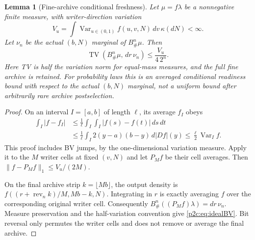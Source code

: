 \documentclass[11pt]{article}
\numberwithin{equation}{section}
\newtheorem{lemma}[theorem]{Lemma}
\theoremstyle{definition}
\theoremstyle{remark}
\begin{document}
\begin{lemma}[Fine-archive conditional freshness]
\label{p2c:lem:BV}
Let $\mu=f\lambda$ be a nonnegative finite measure,
with writer-direction variation
\[
 V_u=\int\operatorname{Var}_{u\in(0,1)}
                         f(u,v,N)\,dv\,\kappa(dN)<\infty.
\]
Let $\nu_n$ be the actual $(b,N)$ marginal of
$B^n_\#\mu$. Then
\begin{equation}\label{p2c:eq:idealBV}
 \operatorname{TV}(B^n_\#\mu,\,dr\,\nu_n)
                   \leq \frac{V_u}{4\,2^n}.
\end{equation}
Here TV is half the variation norm for equal-mass
measures, and the full fine archive is retained. For probability laws
this is an averaged conditional readiness bound with respect to the
actual $(b,N)$ marginal, not a uniform bound after arbitrarily rare
archive postselection.
\end{lemma}

\begin{proof}
On an interval $I=[a,b]$ of length $\ell$, its average
$f_I$ obeys
\begin{align*}
 \int_I|f-f_I|
 &\leq\frac1\ell\int_I\!\int_I|f(s)-f(t)|\,ds\,dt\\
 &\leq\frac1\ell\int_I
        2(y-a)(b-y)\,d|Df|(y)
 \leq\frac\ell2\operatorname{Var}_I f .
\end{align*}
This proof includes BV jumps, by the one-dimensional
variation measure. Apply it to the $M$ writer cells
at fixed $(v,N)$ and let $P_Mf$ be their cell averages.
Then $\|f-P_Mf\|_1\leq V_u/(2M)$.

On the final archive strip $k=\lfloor Mb\rfloor$,
the output density is
$f((r+\operatorname{rev}_n k)/M,Mb-k,N)$.
Integrating in $r$ is exactly averaging $f$ over the
corresponding original writer cell. Consequently
$B^n_\#((P_Mf)\lambda)=dr\,\nu_n$.
Measure preservation and the half-variation convention
give \eqref{p2c:eq:idealBV}. Bit reversal only permutes
the writer cells and does not remove or average the
final archive.
\end{proof}
\end{document}
